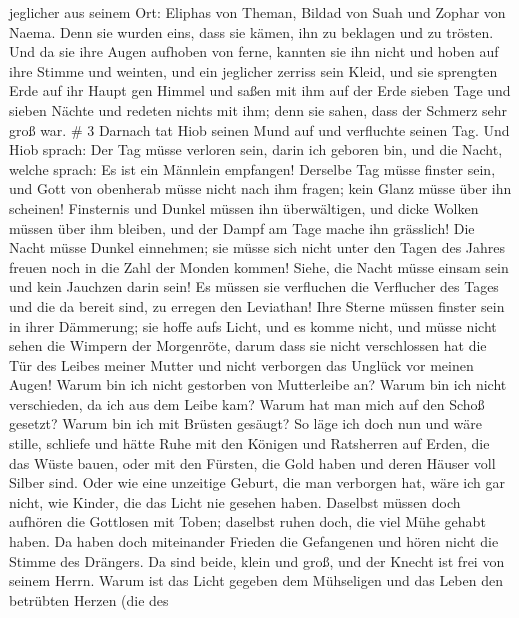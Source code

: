 jeglicher aus seinem Ort: Eliphas von Theman, Bildad von Suah und Zophar
von Naema. Denn sie wurden eins, dass sie kämen, ihn zu beklagen und zu
trösten.  Und da sie ihre Augen aufhoben von ferne, kannten
sie ihn nicht und hoben auf ihre Stimme und weinten, und ein jeglicher
zerriss sein Kleid, und sie sprengten Erde auf ihr Haupt gen Himmel
 und saßen mit ihm auf der Erde sieben Tage und sieben
Nächte und redeten nichts mit ihm; denn sie sahen, dass der Schmerz sehr
groß war. \# 3  Darnach tat Hiob seinen Mund auf und
verfluchte seinen Tag.  Und Hiob sprach:  Der
Tag müsse verloren sein, darin ich geboren bin, und die Nacht, welche
sprach: Es ist ein Männlein empfangen!  Derselbe Tag müsse
finster sein, und Gott von obenherab müsse nicht nach ihm fragen; kein
Glanz müsse über ihn scheinen!  Finsternis und Dunkel müssen
ihn überwältigen, und dicke Wolken müssen über ihm bleiben, und der
Dampf am Tage mache ihn grässlich!  Die Nacht müsse Dunkel
einnehmen; sie müsse sich nicht unter den Tagen des Jahres freuen noch
in die Zahl der Monden kommen!  Siehe, die Nacht müsse
einsam sein und kein Jauchzen darin sein!  Es müssen sie
verfluchen die Verflucher des Tages und die da bereit sind, zu erregen
den Leviathan!  Ihre Sterne müssen finster sein in ihrer
Dämmerung; sie hoffe aufs Licht, und es komme nicht, und müsse nicht
sehen die Wimpern der Morgenröte,  darum dass sie nicht
verschlossen hat die Tür des Leibes meiner Mutter und nicht verborgen
das Unglück vor meinen Augen!  Warum bin ich nicht
gestorben von Mutterleibe an? Warum bin ich nicht verschieden, da ich
aus dem Leibe kam?  Warum hat man mich auf den Schoß
gesetzt? Warum bin ich mit Brüsten gesäugt?  So läge ich
doch nun und wäre stille, schliefe und hätte Ruhe  mit den
Königen und Ratsherren auf Erden, die das Wüste bauen, 
oder mit den Fürsten, die Gold haben und deren Häuser voll Silber sind.
 Oder wie eine unzeitige Geburt, die man verborgen hat,
wäre ich gar nicht, wie Kinder, die das Licht nie gesehen haben.
 Daselbst müssen doch aufhören die Gottlosen mit Toben;
daselbst ruhen doch, die viel Mühe gehabt haben.  Da haben
doch miteinander Frieden die Gefangenen und hören nicht die Stimme des
Drängers.  Da sind beide, klein und groß, und der Knecht
ist frei von seinem Herrn.  Warum ist das Licht gegeben dem
Mühseligen und das Leben den betrübten Herzen  (die des
